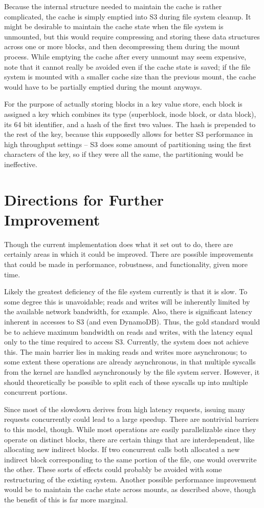\documentclass[11pt]{article}
\begin{document}
Because the internal structure needed to maintain the cache is rather complicated, the cache is simply emptied into S3 during file system cleanup. It might be desirable to maintain the cache state when the file system is unmounted, but this would require compressing and storing these data structures across one or more blocks, and then decompressing them during the mount process. While emptying the cache after every unmount may seem expensive, note that it cannot really be avoided even if the cache state is saved; if the file system is mounted with a smaller cache size than the previous mount, the cache would have to be partially emptied during the mount anyways.

For the purpose of actually storing blocks in a key value store, each block is assigned a key which combines its type (superblock, inode block, or data block), its 64 bit identifier, and a hash of the first two values. The hash is prepended to the rest of the key, because this supposedly allows for better S3 performance in high throughput settings -- S3 does some amount of partitioning using the first characters of the key, so if they were all the same, the partitioning would be ineffective.

\section{Directions for Further Improvement}
Though the current implementation does what it set out to do, there are certainly areas in which it could be improved. There are possible improvements that could be made in performance, robustness, and functionality, given more time.

Likely the greatest deficiency of the file system currently is that it is slow. To some degree this is unavoidable; reads and writes will be inherently limited by the available network bandwidth, for example. Also, there is significant latency inherent in accesses to S3 (and even DynamoDB). Thus, the gold standard would be to achieve maximum bandwidth on reads and writes, with the latency equal only to the time required to access S3. Currently, the system does not achieve this. The main barrier lies in making reads and writes more asynchronous; to some extent these operations are already asynchronous, in that multiple syscalls from the kernel are handled asynchronously by the file system server. However, it should theoretically be possible to split each of these syscalls up into multiple concurrent portions.

Since most of the slowdown derives from high latency requests, issuing many requests concurrently could lead to a large speedup. There are nontrivial barriers to this model, though. While most operations are easily parallelizable since they operate on distinct blocks, there are certain things that are interdependent, like allocating new indirect blocks. If two concurrent calls both allocated a new indirect block corresponding to the same portion of the file, one would overwrite the other. These sorts of effects could probably be avoided with some restructuring of the existing system. Another possible performance improvement would be to maintain the cache state across mounts, as described above, though the benefit of this is far more marginal.
\end{document}
